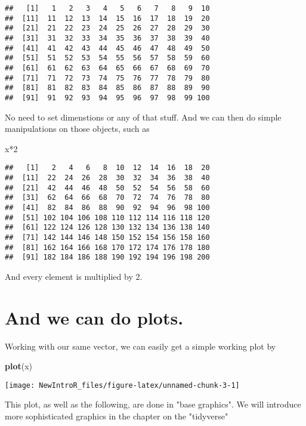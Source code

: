 \documentclass[]{tufte-book}
\newenvironment{Shaded}{}{}
\newcommand{\KeywordTok}[1]{\textcolor[rgb]{0.00,0.44,0.13}{\textbf{#1}}}
\newcommand{\DecValTok}[1]{\textcolor[rgb]{0.25,0.63,0.44}{#1}}
\newcommand{\OperatorTok}[1]{\textcolor[rgb]{0.40,0.40,0.40}{#1}}
\newcommand{\NormalTok}[1]{#1}
\begin{document}
\begin{verbatim}
##   [1]   1   2   3   4   5   6   7   8   9  10
##  [11]  11  12  13  14  15  16  17  18  19  20
##  [21]  21  22  23  24  25  26  27  28  29  30
##  [31]  31  32  33  34  35  36  37  38  39  40
##  [41]  41  42  43  44  45  46  47  48  49  50
##  [51]  51  52  53  54  55  56  57  58  59  60
##  [61]  61  62  63  64  65  66  67  68  69  70
##  [71]  71  72  73  74  75  76  77  78  79  80
##  [81]  81  82  83  84  85  86  87  88  89  90
##  [91]  91  92  93  94  95  96  97  98  99 100
\end{verbatim}

No need to set dimenstions or any of that stuff. And we can then do
simple manipulations on those objects, such as

\begin{Shaded}
\begin{Highlighting}[]
\NormalTok{x}\OperatorTok{*}\DecValTok{2}
\end{Highlighting}
\end{Shaded}

\begin{verbatim}
##   [1]   2   4   6   8  10  12  14  16  18  20
##  [11]  22  24  26  28  30  32  34  36  38  40
##  [21]  42  44  46  48  50  52  54  56  58  60
##  [31]  62  64  66  68  70  72  74  76  78  80
##  [41]  82  84  86  88  90  92  94  96  98 100
##  [51] 102 104 106 108 110 112 114 116 118 120
##  [61] 122 124 126 128 130 132 134 136 138 140
##  [71] 142 144 146 148 150 152 154 156 158 160
##  [81] 162 164 166 168 170 172 174 176 178 180
##  [91] 182 184 186 188 190 192 194 196 198 200
\end{verbatim}

And every element is multiplied by 2.

\section{And we can do plots.}\label{and-we-can-do-plots.}

Working with our same vector, we can easily get a simple working plot by

\begin{Shaded}
\begin{Highlighting}[]
\KeywordTok{plot}\NormalTok{(x)}
\end{Highlighting}
\end{Shaded}

\begin{marginfigure}
\texttt{[image: NewIntroR\_files/figure-latex/unnamed-chunk-3-1]} \caption[This plot, as well as the following, are done in "base graphics"]{This plot, as well as the following, are done in "base graphics".  We will introduce more sophisticated graphics in the chapter on the "tidyverse"}\label{fig:unnamed-chunk-3}
\end{marginfigure}
\end{document}

